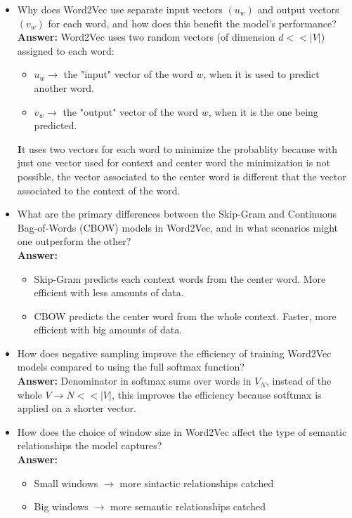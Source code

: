 \documentclass{article}
\begin{document}
	\begin{itemize}
		\item Why does Word2Vec use separate input vectors $(u_w)$ and output vectors
$(v_w)$ for each word, and how does this benefit the model’s performance?\\
\textbf{Answer:} Word2Vec uses two random vectors (of dimension $d << |V|$) assigned to each word:
		\begin{itemize}
			\item $u_w \rightarrow$ the "input" vector of the word $w$, when it is used to predict another word.
			\item $v_w \rightarrow$ the "output" vector of the word $w$, when it is the one being predicted.
		\end{itemize}
\textbf It uses two vectors for each word to minimize the probablity because with just one vector used for context and center word the minimization is not possible, the vector associated to the center word is different that the vector associated to the context of the word.

		\item What are the primary differences between the Skip-Gram and Continuous
Bag-of-Words (CBOW) models in Word2Vec, and in what scenarios might
one outperform the other?\\
\textbf{Answer:}
		\begin{itemize} 
			\item Skip-Gram predicts each context words from the center word. More efficient with less amounts of data.
		       	\item CBOW predicts the center word from the whole context. Faster, more efficient with big amounts of data.
		\end{itemize}

		\item How does negative sampling improve the efficiency of training Word2Vec
models compared to using the full softmax function?\\
\textbf{Answer:} Denominator in softmax sums over words in $V_N$, instead of the whole $V \rightarrow N<<|V|$, this improves the efficiency because sotftmax is applied on a shorter vector.

		\item How does the choice of window size in Word2Vec affect the type of semantic
relationships the model captures?\\
\textbf{Answer:}
		\begin{itemize}
			\item Small windows $\rightarrow$ more sintactic relationships catched
			\item Big windows $\rightarrow$ more semantic relationships catched
		\end{itemize}


\end{itemize}
\end{document}
